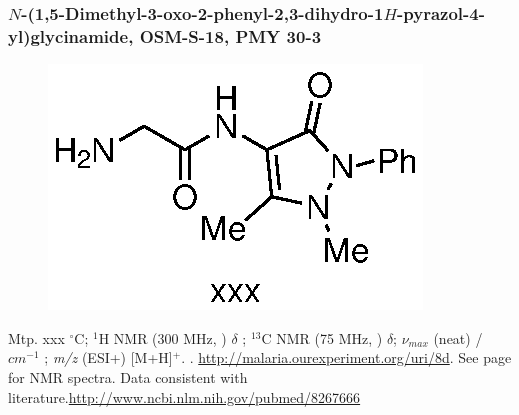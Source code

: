 \documentclass[12pt, a4paper,titlepage]{article}
\begin{document}
\subsubsection*{$N$-(1,5-Dimethyl-3-oxo-2-phenyl-2,3-dihydro-1$H$-pyrazol-4-yl)glycinamide, OSM-S-18, PMY 30-3}
\label{exp:PMY30}
	\begin{figure}[H]
	\begin{center}
	\includegraphics{exp/PMY30.eps}
	\end{center}
	\vspace{-25pt}	
	\end{figure}	

Mtp. xxx $^\circ$C;
$^1$H NMR (300 MHz, ) $\delta$ ; 
$^{13}$C NMR (75 MHz, ) $\delta$;
 $\nu_{max}$ (neat) /$cm^{-1}$ ;
\emph{m/z} (ESI+) [M+H]$^+$.
.
\url{http://malaria.ourexperiment.org/uri/8d}.
 See page \pageref{spec:PMY30} for NMR spectra. Data consistent with literature.\url{http://www.ncbi.nlm.nih.gov/pubmed/8267666}



\end{document}
